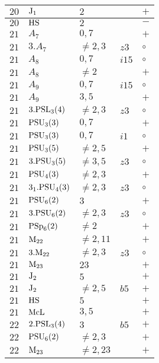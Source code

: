 \documentclass[a4paper, 11pt]{article}
\begin{document}
\begin{longtable}{lllll}
		$20$ & ${\rm J}_1$ & $2$ & & $+$ \\ \hline
		$20$ & ${\rm HS}$ & $2$ & & $-$ \\ \hline
		$21$ & $A_{7}$ & $0,7$ & & $+$ \\ \hline
		$21$ & $3.A_{7}$ & $\neq 2,3$ & $z3$ & $\circ$ \\ \hline
		$21$ & $A_{8}$ & $0,7$ & $i15$ & $\circ$ \\ \hline
		$21$ & $A_{8}$ & $\neq 2$ & & $+$ \\ \hline
		$21$ & $A_{9}$ & $0,7$ & $i15$ & $\circ$ \\ \hline
		$21$ & $A_{9}$ & $3,5$ & & $+$ \\ \hline
		$21$ & $3.{\rm PSL}_{3}(4)$ & $\neq 2,3$ & $z3$ & $\circ$ \\ \hline
		$21$ & ${\rm PSU}_{3}(3)$ & $0,7$ & & $+$ \\ \hline
		$21$ & ${\rm PSU}_{3}(3)$ & $0,7$ & $i1$ & $\circ$ \\ \hline
		$21$ & ${\rm PSU}_{3}(5)$ & $\neq 2,5$ & & $+$ \\ \hline
		$21$ & $3.{\rm PSU}_{3}(5)$ & $\neq 3,5$ & $z3$ & $\circ$ \\ \hline
		$21$ & ${\rm PSU}_{4}(3)$ & $\neq 2,3$ & & $+$ \\ \hline
		$21$ & $3_1.{\rm PSU}_{4}(3)$ & $\neq 2,3$ & $z3$ & $\circ$ \\ \hline
		$21$ & ${\rm PSU}_{6}(2)$ & $3$ & & $+$ \\ \hline
		$21$ & $3.{\rm PSU}_{6}(2)$ & $\neq 2,3$ & $z3$ & $\circ$ \\ \hline
		$21$ & ${\rm PSp}_{6}(2)$ & $\neq 2$ & & $+$ \\ \hline
		$21$ & ${\rm M}_{22}$ & $\neq 2,11$ & & $+$ \\ \hline
		$21$ & $3.{\rm M}_{22}$ & $\neq 2,3$ & $z3$ & $\circ$ \\ \hline
		$21$ & ${\rm M}_{23}$ & $23$ & & $+$ \\ \hline
		$21$ & ${\rm J}_2$ & $5$ & & $+$ \\ \hline
		$21$ & ${\rm J}_2$ & $\neq 2,5$ & $b5$ & $+$ \\ \hline
		$21$ & ${\rm HS}$ & $5$ & & $+$ \\ \hline
		$21$ & ${\rm McL}$ & $3,5$ & & $+$ \\ \hline
		$22$ & $2.{\rm PSL}_{3}(4)$ & $3$ & $b5$ & $+$ \\ \hline
		$22$ & ${\rm PSU}_{6}(2)$ & $\neq 2,3$ & & $+$ \\ \hline
		$22$ & ${\rm M}_{23}$ & $\neq 2,23$ & & $+$ \\ \hline

\end{longtable}
\end{document}
